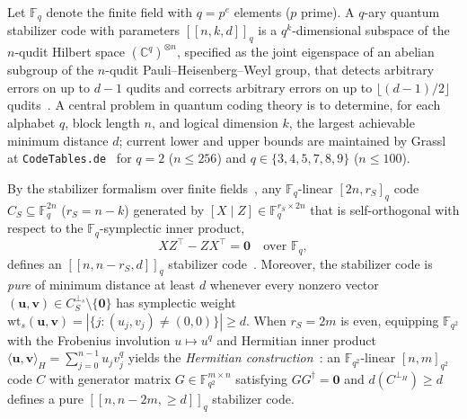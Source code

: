 \documentclass[11pt,a4paper]{article}
\newcommand{\vb}[1]{\symbf{#1}}
\newcommand{\vb}[1]{\mathbf{#1}}
\theoremstyle{remark}
\begin{document}
Let $\mathbb{F}_q$ denote the finite field with $q = p^e$ elements ($p$ prime). A $q$-ary quantum stabilizer code with parameters $[[n, k, d]]_q$ is a $q^k$-dimensional subspace of the $n$-qudit Hilbert space $(\mathbb{C}^q)^{\otimes n}$, specified as the joint eigenspace of an abelian subgroup of the $n$-qudit Pauli--Heisenberg--Weyl group, that detects arbitrary errors on up to $d - 1$ qudits and corrects arbitrary errors on up to $\lfloor (d - 1)/2 \rfloor$ qudits~\cite{Calderbank1998,Rains1999,Ashikhmin2001,Ketkar2006}. A central problem in quantum coding theory is to determine, for each alphabet $q$, block length $n$, and logical dimension $k$, the largest achievable minimum distance $d$; current lower and upper bounds are maintained by Grassl at \texttt{CodeTables.de}~\cite{Grassl2007} for $q = 2$ ($n \le 256$) and $q \in \{3, 4, 5, 7, 8, 9\}$ ($n \le 100$).

By the stabilizer formalism over finite fields~\cite{Ashikhmin2001,Ketkar2006}, any $\mathbb{F}_q$-linear $[2n, r_S]_q$ code $C_S \subseteq \mathbb{F}_q^{2n}$ ($r_S = n - k$) generated by $[X \mid Z] \in \mathbb{F}_q^{r_S \times 2n}$ that is self-orthogonal with respect to the $\mathbb{F}_q$-symplectic inner product,
\begin{equation}\label{eq:symp_ortho}
  X Z^\top - Z X^\top = \vb{0} \quad \text{over } \mathbb{F}_q,
\end{equation}
defines an $[[n, n - r_S, d]]_q$ stabilizer code~\cite[Lemma~16 \& Corollary~19]{Ketkar2006}. Moreover, the stabilizer code is \emph{pure} of minimum distance at least $d$ whenever every nonzero vector $(\vb{u}, \vb{v}) \in C_S^{\perp_s} \setminus \{\vb{0}\}$ has symplectic weight $\mathrm{wt}_s(\vb{u}, \vb{v}) = |\{j : (u_j, v_j) \ne (0, 0)\}| \ge d$. When $r_S = 2m$ is even, equipping $\mathbb{F}_{q^2}$ with the Frobenius involution $u \mapsto u^q$ and Hermitian inner product $\langle \vb{u}, \vb{v} \rangle_H = \sum_{j=0}^{n-1} u_j v_j^q$ yields the \emph{Hermitian construction}~\cite{Ashikhmin2001,Ketkar2006}: an $\mathbb{F}_{q^2}$-linear $[n, m]_{q^2}$ code $C$ with generator matrix $G \in \mathbb{F}_{q^2}^{m \times n}$ satisfying $G G^\dagger = \vb{0}$ and $d(C^{\perp_H}) \ge d$ defines a pure $[[n, n - 2m, \ge d]]_q$ stabilizer code.
\end{document}

